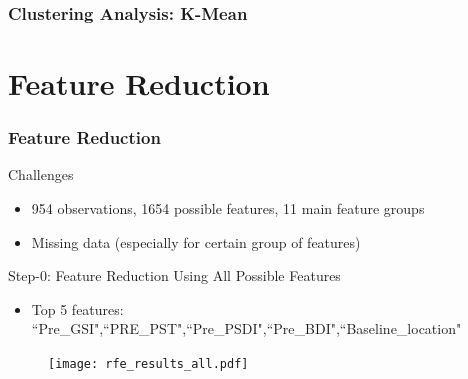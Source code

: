 \documentclass{beamer}
\begin{document}
\begin{frame}
\frametitle{Clustering Analysis: K-Mean}
\begin{overprint}


\end{overprint}
\end{frame}

\section{Feature Reduction}

\begin{frame}\frametitle{Feature Reduction}
\begin{block}{Challenges}
\begin{itemize}
\item 954 observations, 1654 possible features, 11 main feature groups
\item Missing data (especially for certain group of features)
	\end{itemize}\end{block}
\begin{block}{Step-0: Feature Reduction Using All Possible Features}
	\begin{itemize}
	\item 	Top 5 features: ``Pre\_GSI",``PRE\_PST",``Pre\_PSDI",``Pre\_BDI",``Baseline\_location"\end{itemize}
	\begin{figure}[ht]
\texttt{[image: rfe\_results\_all.pdf]}	\end{figure}	
\end{block}	
\end{frame}
\end{document}
